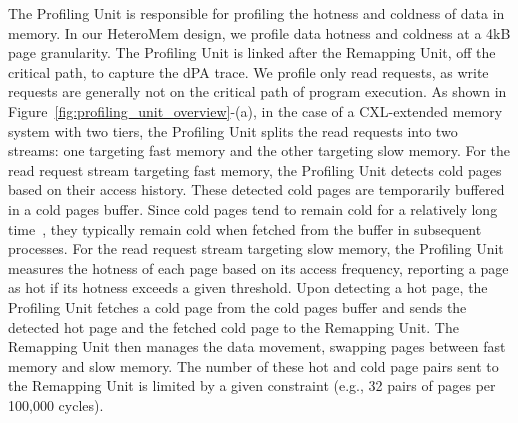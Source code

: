 The Profiling Unit is responsible for profiling the hotness and coldness of data in memory. In our HeteroMem design, we profile data hotness and coldness at a 4kB page granularity. 
The Profiling Unit is linked after the Remapping Unit, off the critical path, to capture the dPA trace. 
We profile only read requests, as write requests are generally not on the critical path of program execution.
As shown in Figure~\ref{fig:profiling_unit_overview}-(a), in the case of a CXL-extended memory system with two tiers, the Profiling Unit splits the read requests into two streams: one targeting fast memory and the other targeting slow memory. 
For the read request stream targeting fast memory, the Profiling Unit detects cold pages based on their access history. These detected cold pages are temporarily buffered in a cold pages buffer. Since cold pages tend to remain cold for a relatively long time~\cite{tmts_asplos2023}, they typically remain cold when fetched from the buffer in subsequent processes.
For the read request stream targeting slow memory, the Profiling Unit measures the hotness of each page based on its access frequency, reporting a page as hot if its hotness exceeds a given threshold. Upon detecting a hot page, the Profiling Unit fetches a cold page from the cold pages buffer and sends the detected hot page and the fetched cold page to the Remapping Unit.
The Remapping Unit then manages the data movement, swapping pages between fast memory and slow memory. The number of these hot and cold page pairs sent to the Remapping Unit is limited by a given constraint (e.g., 32 pairs of pages per 100,000 cycles).


